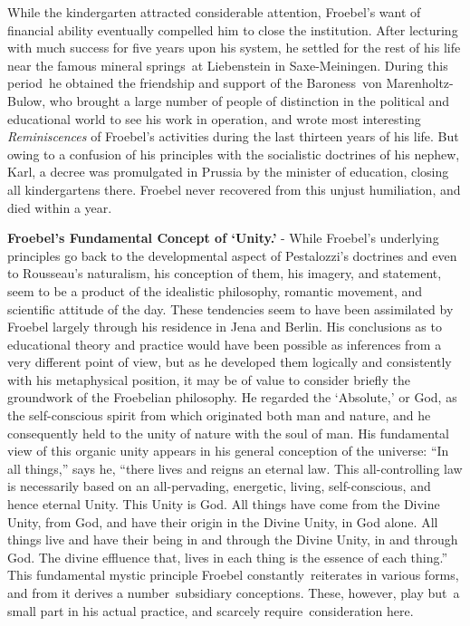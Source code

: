 \documentclass[
]{book}
\begin{document}
While the kindergarten attracted considerable attention, Froebel's want of financial ability eventually compelled him to close the institution. After lecturing with much success for five years upon his system, he settled for the rest of his life near the famous mineral springs~at Liebenstein in Saxe-Meiningen. During this period~he obtained the friendship and support of the Baroness~von Marenholtz-Bulow, who brought a large number of people of distinction in the political and educational world to see his work in operation, and wrote most interesting \emph{Reminiscences} of Froebel's activities during the last thirteen years of his life. But owing to a confusion of his principles with the socialistic doctrines of his nephew, Karl, a decree was promulgated in Prussia by the minister of education, closing all kindergartens there. Froebel never recovered from this unjust humiliation, and died within a year.

\textbf{Froebel's Fundamental Concept of `Unity.'} - While Froebel's underlying principles go back to the developmental aspect of Pestalozzi's doctrines and even to Rousseau's naturalism, his conception of them, his imagery, and statement, seem to be a product of the idealistic philosophy, romantic movement, and scientific attitude of the day. These tendencies seem to have been assimilated by Froebel largely through his residence in Jena and Berlin. His conclusions as to educational theory and practice would have been possible as inferences from a very different point of view, but as he developed them logically and consistently with his metaphysical position, it may be of value to consider briefly the groundwork of the Froebelian philosophy. He regarded the `Absolute,' or God, as the self-conscious spirit from which originated both man and nature, and he consequently held to the unity of nature with the soul of man. His fundamental view of this organic unity appears in his general conception of the universe: ``In all things,'' says he, ``there lives and reigns an eternal law. This all-controlling law is necessarily based on an all-pervading, energetic, living, self-conscious, and hence eternal Unity. This Unity is God. All things have come from the Divine Unity, from God, and have their origin in the Divine Unity, in God alone. All things live and have their being in and through the Divine Unity, in and through God. The divine effluence that, lives in each thing is the essence of each thing.'' This fundamental mystic principle Froebel constantly~reiterates in various forms, and from it derives a number~subsidiary conceptions. These, however, play but~a small part in his actual practice, and scarcely require~consideration here.
\end{document}
